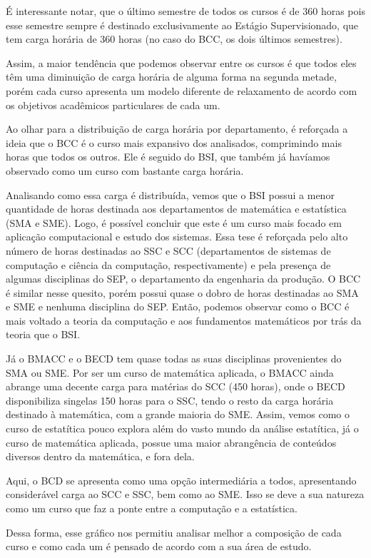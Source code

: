 \documentclass[12pt]{article}
\begin{document}
É interessante notar, que o último semestre de todos os cursos é de 360 horas
pois esse semestre sempre é destinado exclusivamente ao Estágio Supervisionado,
que tem carga horária de 360 horas (no caso do BCC, os dois últimos semestres).

Assim, a maior tendência que podemos observar entre os cursos é que todos eles
têm uma diminuição de carga horária de alguma forma na segunda metade, porém
cada curso apresenta um modelo diferente de relaxamento de acordo com os
objetivos acadêmicos particulares de cada um.

Ao olhar para a distribuição de carga horária por departamento, é reforçada a
ideia que o BCC é o curso mais expansivo dos analisados, comprimindo mais horas
que todos os outros. Ele é seguido do BSI, que também já havíamos observado
como um curso com bastante carga horária.

Analisando como essa carga é distribuída, vemos que o BSI possui a menor
quantidade de horas destinada aos departamentos de matemática e estatística
(SMA e SME). Logo, é possível concluir que este é um curso mais focado em
aplicação computacional e estudo dos sistemas. Essa tese é reforçada pelo alto
número de horas destinadas ao SSC e SCC (departamentos de sistemas de
computação e ciência da computação, respectivamente) e pela presença de algumas
disciplinas do SEP, o departamento da engenharia da produção. O BCC é similar
nesse quesito, porém possui quase o dobro de horas destinadas ao SMA e SME e
nenhuma disciplina do SEP. Então, podemos observar como o BCC é mais voltado a
teoria da computação e aos fundamentos matemáticos por trás da teoria que o
BSI.

Já o BMACC e o BECD tem quase todas as suas disciplinas provenientes do SMA ou
SME. Por ser um curso de matemática aplicada, o BMACC ainda abrange uma decente
carga para matérias do SCC (450 horas), onde o BECD disponibiliza singelas 150
horas para o SSC, tendo o resto da carga horária destinado à matemática, com a
grande maioria do SME. Assim, vemos como o curso de estatítica pouco explora
além do vasto mundo da análise estatítica, já o curso de matemática aplicada,
possue uma maior abrangência de conteúdos diversos dentro da matemática, e fora
dela.

Aqui, o BCD se apresenta como uma opção intermediária a todos, apresentando
considerável carga ao SCC e SSC, bem como ao SME. Isso se deve a sua natureza
como um curso que faz a ponte entre a computação e a estatística.

Dessa forma, esse gráfico nos permitiu analisar melhor a composição de cada
curso e como cada um é pensado de acordo com a sua área de estudo.
\end{document}

